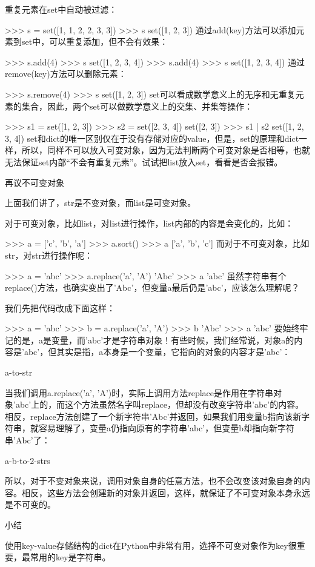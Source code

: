 \documentclass[10pt,a4paper]{ctexbook}
\begin{document}
重复元素在set中自动被过滤：

>>> s = set([1, 1, 2, 2, 3, 3])
>>> s
set([1, 2, 3])
通过add(key)方法可以添加元素到set中，可以重复添加，但不会有效果：

>>> s.add(4)
>>> s
set([1, 2, 3, 4])
>>> s.add(4)
>>> s
set([1, 2, 3, 4])
通过remove(key)方法可以删除元素：

>>> s.remove(4)
>>> s
set([1, 2, 3])
set可以看成数学意义上的无序和无重复元素的集合，因此，两个set可以做数学意义上的交集、并集等操作：

>>> s1 = set([1, 2, 3])
>>> s2 = set([2, 3, 4])
set([2, 3])
>>> s1 | s2
set([1, 2, 3, 4])
set和dict的唯一区别仅在于没有存储对应的value，但是，set的原理和dict一样，所以，同样不可以放入可变对象，因为无法判断两个可变对象是否相等，也就无法保证set内部“不会有重复元素”。试试把list放入set，看看是否会报错。

再议不可变对象

上面我们讲了，str是不变对象，而list是可变对象。

对于可变对象，比如list，对list进行操作，list内部的内容是会变化的，比如：

>>> a = ['c', 'b', 'a']
>>> a.sort()
>>> a
['a', 'b', 'c']
而对于不可变对象，比如str，对str进行操作呢：

>>> a = 'abc'
>>> a.replace('a', 'A')
'Abc'
>>> a
'abc'
虽然字符串有个replace()方法，也确实变出了'Abc'，但变量a最后仍是'abc'，应该怎么理解呢？

我们先把代码改成下面这样：

>>> a = 'abc'
>>> b = a.replace('a', 'A')
>>> b
'Abc'
>>> a
'abc'
要始终牢记的是，a是变量，而'abc'才是字符串对象！有些时候，我们经常说，对象a的内容是'abc'，但其实是指，a本身是一个变量，它指向的对象的内容才是'abc'：

a-to-str

当我们调用a.replace('a', 'A')时，实际上调用方法replace是作用在字符串对象'abc'上的，而这个方法虽然名字叫replace，但却没有改变字符串'abc'的内容。相反，replace方法创建了一个新字符串'Abc'并返回，如果我们用变量b指向该新字符串，就容易理解了，变量a仍指向原有的字符串'abc'，但变量b却指向新字符串'Abc'了：

a-b-to-2-strs

所以，对于不变对象来说，调用对象自身的任意方法，也不会改变该对象自身的内容。相反，这些方法会创建新的对象并返回，这样，就保证了不可变对象本身永远是不可变的。

小结

使用key-value存储结构的dict在Python中非常有用，选择不可变对象作为key很重要，最常用的key是字符串。
\end{document}
